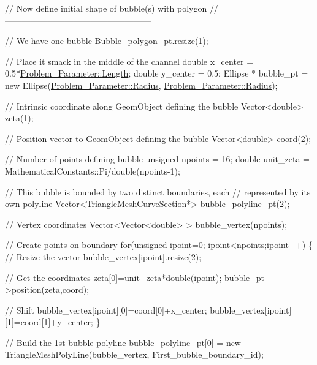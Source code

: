\begin{DoxyCodeInclude}
 \textcolor{comment}{// Now define initial shape of bubble(s) with polygon}
 \textcolor{comment}{//---------------------------------------------------}

 \textcolor{comment}{// We have one bubble}
 Bubble\_polygon\_pt.resize(1);

 \textcolor{comment}{// Place it smack in the middle of the channel}
 \textcolor{keywordtype}{double} x\_center = 0.5*\hyperlink{namespaceProblem__Parameter_a7b67840fea463f29b53d12f7bd7cb34b}{Problem\_Parameter::Length};
 \textcolor{keywordtype}{double} y\_center = 0.5;
 Ellipse * bubble\_pt = \textcolor{keyword}{new} Ellipse(\hyperlink{namespaceProblem__Parameter_a903237528f0e9bb92debcc8842576cca}{Problem\_Parameter::Radius},
                                       \hyperlink{namespaceProblem__Parameter_a903237528f0e9bb92debcc8842576cca}{Problem\_Parameter::Radius});
 
 \textcolor{comment}{// Intrinsic coordinate along GeomObject defining the bubble}
 Vector<double> zeta(1);
 
 \textcolor{comment}{// Position vector to GeomObject defining the bubble}
 Vector<double> coord(2);
 
 \textcolor{comment}{// Number of points defining bubble}
 \textcolor{keywordtype}{unsigned} npoints = 16; 
 \textcolor{keywordtype}{double} unit\_zeta = MathematicalConstants::Pi/double(npoints-1);
 
 \textcolor{comment}{// This bubble is bounded by two distinct boundaries, each}
 \textcolor{comment}{// represented by its own polyline}
 Vector<TriangleMeshCurveSection*> bubble\_polyline\_pt(2);
 
 \textcolor{comment}{// Vertex coordinates}
 Vector<Vector<double> > bubble\_vertex(npoints);
 
 \textcolor{comment}{// Create points on boundary}
 \textcolor{keywordflow}{for}(\textcolor{keywordtype}{unsigned} ipoint=0; ipoint<npoints;ipoint++)
  \{
   \textcolor{comment}{// Resize the vector }
   bubble\_vertex[ipoint].resize(2);
   
   \textcolor{comment}{// Get the coordinates}
   zeta[0]=unit\_zeta*double(ipoint);
   bubble\_pt->position(zeta,coord);

   \textcolor{comment}{// Shift}
   bubble\_vertex[ipoint][0]=coord[0]+x\_center;
   bubble\_vertex[ipoint][1]=coord[1]+y\_center;
  \}
 
 \textcolor{comment}{// Build the 1st bubble polyline}
 bubble\_polyline\_pt[0] = \textcolor{keyword}{new} TriangleMeshPolyLine(bubble\_vertex,
                                                  First\_bubble\_boundary\_id);


\end{DoxyCodeInclude}
